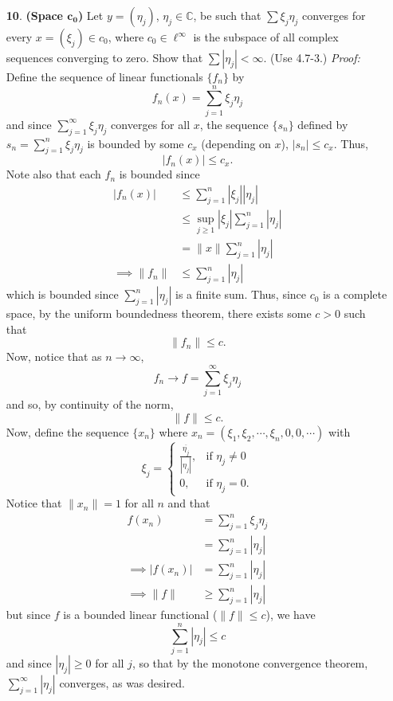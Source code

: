 \documentclass{article}
\begin{document}
\begin{itemize}
    \item[\textbf{10}.] \textbf{(Space $\mathbf{c_0}$)} Let $y = (\eta_j)$, $\eta_j \in \mathbb{C}$, be such that $\sum \xi_j\eta_j$ converges for every $x = (\xi_j) \in c_0$, where $c_0 \in \ell^{\infty}$ is the subspace of all complex sequences converging to zero. Show that $\sum |\eta_j| < \infty$. (Use 4.7-3.)
    \newline\newline
    \textit{Proof:} Define the sequence of linear functionals $\{f_n\}$ by
    \[f_n(x) = \sum_{j = 1}^n \xi_j\eta_j \tag{$x = (\xi_1, \xi_2, \cdots)$}\]
    and since $\sum_{j = 1}^{\infty} \xi_j\eta_j$ converges for all $x$, the sequence $\{s_n\}$ defined by $s_n = \sum_{j = 1}^n \xi_j\eta_j$ is bounded by some $c_x$ (depending on $x$), $|s_n| \leq c_x$. Thus,
    \[|f_n(x)| \leq c_x.\]
    Note also that each $f_n$ is bounded since
    \begin{align*}
        |f_n(x)| &\leq \sum_{j = 1}^n |\xi_j||\eta_j| \tag*{(Triangle Inequality)}\\
        &\leq \sup_{j \geq 1} |\xi_j| \sum_{j = 1}^n |\eta_j|\\
        &= \|x\|\sum_{j = 1}^n |\eta_j|\\
        \implies \|f_n\| &\leq \sum_{j = 1}^n|\eta_j|
    \end{align*}
    which is bounded since $\sum_{j = 1}^n|\eta_j|$ is a finite sum. Thus, since $c_0$ is a complete space, by the uniform boundedness theorem, there exists some $c > 0$ such that 
    \[\|f_n\| \leq c.\]
    Now, notice that as $n \to \infty$,
    \[f_n \to f = \sum_{j = 1}^{\infty} \xi_j\eta_j\]
    and so, by continuity of the norm,
    \[\|f\| \leq c.\]
    Now, define the sequence $\{x_n\}$ where $x_n = (\xi_1, \xi_2, \cdots, \xi_n, 0, 0, \cdots)$ with
    \[\xi_j = \begin{cases}
        \frac{\overline{\eta_j}}{|\eta_j|}, & \text{if } \eta_j \neq 0\\
        0, & \text{if } \eta_j = 0.
    \end{cases}\]
    Notice that $\|x_n\| = 1$ for all $n$ and that
    \begin{align*}
        f(x_n) &= \sum_{j = 1}^{n} \xi_j\eta_j\\
        &= \sum_{j = 1}^n |\eta_j|\\
        \implies |f(x_n)| &= \sum_{j = 1}^n |\eta_j|\\
        \implies \|f\| &\geq \sum_{j = 1}^n |\eta_j|
    \end{align*}
    but since $f$ is a bounded linear functional ($\|f\| \leq c$), we have
    \[\sum_{j = 1}^n |\eta_j| \leq c\]
    and since $|\eta_j| \geq 0$ for all $j$, so that by the monotone convergence theorem, $\sum_{j = 1}^{\infty}|\eta_j|$ converges, as was desired.
    
\end{itemize}
\end{document}
